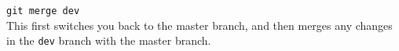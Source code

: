 \documentclass[11pt]{article}
\begin{document}
{\tt git merge dev} \\

\noindent
This first switches you back to the master branch, and then merges any changes in the {\tt dev} branch with the master branch. \\

\begin{comment}
\noindent
{\bf Restoring Previous Versions from Repository} \\

\noindent
Each {\tt git} commit associates an {\small MD5} checksum with the transaction. This checksum allows you to revert to previous instances from the repository. For example, you may have modified a version of a file, and then realized your modified version no longer works. The easiest thing to do is restore the earlier version from the repository. \\

\noindent
The following command outputs the log (the checksum associated with each commit): \\

{\tt git log} \\

\noindent
If you can determine the checksum associated with the previous commit, you can use that checksum to restore a file. Let's assume you wish to restore the file {\tt file1.txt} and the checksum is {\tt  fc73a5a9e0b8c46c15afd2a656794d48621c4647}. You would enter \\

{\tt git checkout fc73a5a9e0b8c46c15afd2a656794d48621c4647 file1.txt} \\

\noindent
This will replace your local copy of {\tt file1.txt} with the version (specified with the checksum) from the repository. \\

\noindent
{\bf Restoring Previous Commit}\\

\noindent
If you wish to restore the state to the most recent previous commit (let's assume you had made several changes to files and wish to revert to the previous commit), enter: \\

{\tt git reset --hard}\\

\noindent
This restores the branch to the previous commit. \\

\noindent
If you wish to restore to earlier commits, you would enter \\

{\tt git reset --hard} // 1 commit back
 
{\tt git reset - -hard HEAD} // 2 commits back 

{\tt git reset  --hard HEAD} // 3 commits back \\
 
 [THIS HAS TO BE CLARIFIED - LOOK AT {\tt man git-reset}]
 
 \end{comment}
\end{document}
